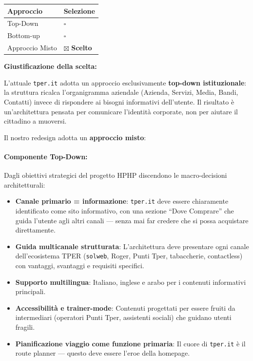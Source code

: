 \begin{tcolorbox}[colback=backgroundColor,colframe=borderColor,arc=2mm]
{\small
\renewcommand{\arraystretch}{1.3}
\begin{tabular}{|p{3cm}|p{10cm}|}
\hline
\textbf{Approccio} & \textbf{Selezione} \\
\hline
Top-Down & $\square$ \\
\hline
Bottom-up & $\square$ \\
\hline
Approccio Misto & $\boxtimes$ \textbf{Scelto} \\
\hline
\end{tabular}

\vspace{0.3cm}

\textbf{Giustificazione della scelta:}

L'attuale \texttt{tper.it} adotta un approccio esclusivamente \textbf{top-down istituzionale}: la struttura ricalca l'organigramma aziendale (Azienda, Servizi, Media, Bandi, Contatti) invece di rispondere ai bisogni informativi dell'utente. Il risultato è un'architettura pensata per comunicare l'identità corporate, non per aiutare il cittadino a muoversi.

Il nostro redesign adotta un \textbf{approccio misto}:

\paragraph{Componente Top-Down:} Dagli obiettivi strategici del progetto HPHP discendono le macro-decisioni architetturali:
\begin{itemize}
 \item \textbf{Canale primario = informazione}: \texttt{tper.it} deve essere chiaramente identificato come sito informativo, con una sezione ``Dove Comprare'' che guida l'utente agli altri canali --- senza mai far credere che si possa acquistare direttamente.
 \item \textbf{Guida multicanale strutturata}: L'architettura deve presentare ogni canale dell'ecosistema TPER (\texttt{solweb}, Roger, Punti Tper, tabaccherie, contactless) con vantaggi, svantaggi e requisiti specifici.
 \item \textbf{Supporto multilingua}: Italiano, inglese e arabo per i contenuti informativi principali.
 \item \textbf{Accessibilità e trainer-mode}: Contenuti progettati per essere fruiti da intermediari (operatori Punti Tper, assistenti sociali) che guidano utenti fragili.
 \item \textbf{Pianificazione viaggio come funzione primaria}: Il cuore di \texttt{tper.it} è il route planner --- questo deve essere l'eroe della homepage.
\end{itemize}

}
\end{tcolorbox}
